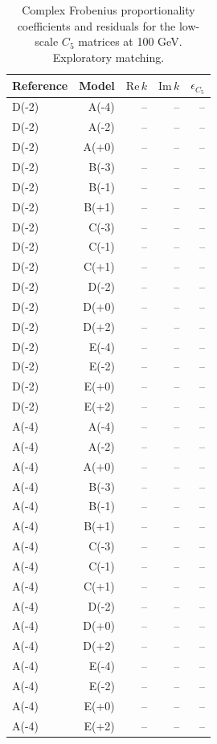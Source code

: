 \begin{table}[htbp]
\centering
\small
\setlength{\tabcolsep}{3.4pt}
\begin{tabular}{lrrrr}
\hline
Reference & Model & $\mathrm{Re}\,k$ & $\mathrm{Im}\,k$ & $\epsilon_{C_5}$ \\
\hline
D(-2) & A(-4) & -- & -- & -- \\
D(-2) & A(-2) & -- & -- & -- \\
D(-2) & A(+0) & -- & -- & -- \\
D(-2) & B(-3) & -- & -- & -- \\
D(-2) & B(-1) & -- & -- & -- \\
D(-2) & B(+1) & -- & -- & -- \\
D(-2) & C(-3) & -- & -- & -- \\
D(-2) & C(-1) & -- & -- & -- \\
D(-2) & C(+1) & -- & -- & -- \\
D(-2) & D(-2) & -- & -- & -- \\
D(-2) & D(+0) & -- & -- & -- \\
D(-2) & D(+2) & -- & -- & -- \\
D(-2) & E(-4) & -- & -- & -- \\
D(-2) & E(-2) & -- & -- & -- \\
D(-2) & E(+0) & -- & -- & -- \\
D(-2) & E(+2) & -- & -- & -- \\
A(-4) & A(-4) & -- & -- & -- \\
A(-4) & A(-2) & -- & -- & -- \\
A(-4) & A(+0) & -- & -- & -- \\
A(-4) & B(-3) & -- & -- & -- \\
A(-4) & B(-1) & -- & -- & -- \\
A(-4) & B(+1) & -- & -- & -- \\
A(-4) & C(-3) & -- & -- & -- \\
A(-4) & C(-1) & -- & -- & -- \\
A(-4) & C(+1) & -- & -- & -- \\
A(-4) & D(-2) & -- & -- & -- \\
A(-4) & D(+0) & -- & -- & -- \\
A(-4) & D(+2) & -- & -- & -- \\
A(-4) & E(-4) & -- & -- & -- \\
A(-4) & E(-2) & -- & -- & -- \\
A(-4) & E(+0) & -- & -- & -- \\
A(-4) & E(+2) & -- & -- & -- \\
\hline
\end{tabular}
\caption{Complex Frobenius proportionality coefficients and residuals for the low-scale $C_5$ matrices at 100 GeV. Exploratory matching.}
\label{tab:generalised_b4}
\end{table}
